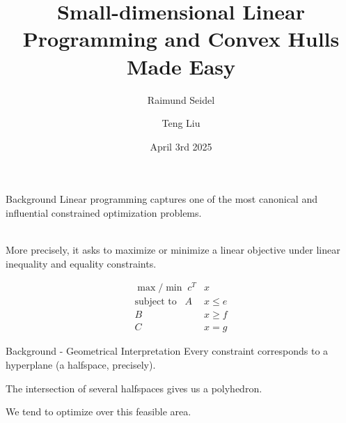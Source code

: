 \documentclass{beamer}
\title[Seminar Geometry: Combinatorics and Algorithms FS25] %
{Small-dimensional Linear Programming and Convex Hulls Made Easy}
\subtitle{Raimund Seidel}
\author[Teng Liu] %
{Teng Liu}
\date[]{April 3rd 2025}
\begin{document}
\frame{\titlepage}


\begin{frame}{Background}
    Linear programming captures one of the most canonical and influential constrained optimization problems. \\~\
    
    More precisely, it asks to maximize or minimize a linear objective under linear
inequality and equality constraints.


\begin{align*}
    \max / \min \; c^T  &x \\
   \text{subject to} \;\;\; A&x \le e \\
    B&x \ge f \\
    C&x = g
\end{align*}


\end{frame}

\begin{frame}{Background - Geometrical Interpretation}
    Every constraint corresponds to a hyperplane (a halfspace, precisely).

    The intersection of several halfspaces gives us a polyhedron.

    We tend to optimize over this feasible area.
\end{frame}
\end{document}

